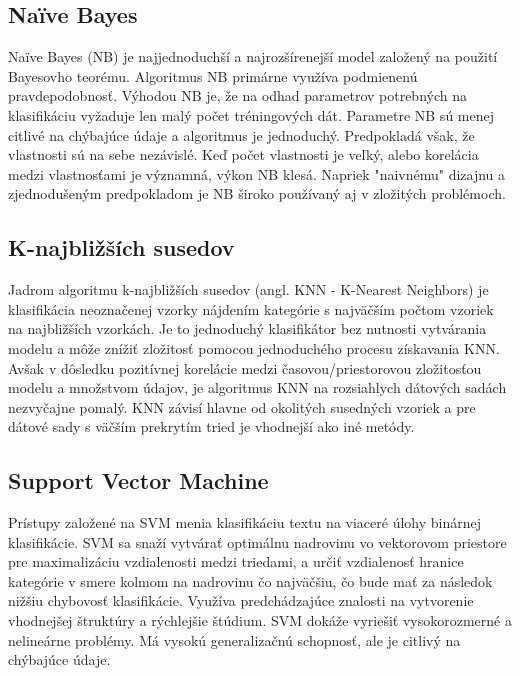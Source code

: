 \subsection*{Naïve Bayes}
Naïve Bayes (NB) je najjednoduchší a najrozšírenejší model založený na použití Bayesovho teorému. Algoritmus NB primárne využíva podmienenú pravdepodobnosť. Výhodou NB je, že na odhad parametrov potrebných na klasifikáciu vyžaduje len malý počet tréningových dát. Parametre NB sú menej citlivé na chýbajúce údaje a algoritmus je jednoduchý. Predpokladá však, že vlastnosti sú na sebe nezávislé. Keď počet vlastnosti je veľký, alebo korelácia medzi vlastnosťami je významná, výkon NB klesá. Napriek "naivnému" dizajnu a zjednodušeným predpokladom je NB široko používaný aj v zložitých problémoch.

\subsection*{K-najbližších susedov}
Jadrom algoritmu k-najbližších susedov (angl. KNN - K-Nearest Neighbors) je klasifikácia neoznačenej vzorky nájdením kategórie s najväčším počtom vzoriek na  najbližších vzorkách. Je to jednoduchý klasifikátor bez nutnosti vytvárania modelu a môže znížiť zložitosť pomocou jednoduchého procesu získavania KNN. Avšak v dôsledku pozitívnej korelácie medzi časovou/priestorovou zložitosťou modelu a množstvom údajov, je algoritmus KNN na rozsiahlych dátových sadách nezvyčajne pomalý. KNN závisí hlavne od okolitých susedných vzoriek a pre dátové sady s väčším prekrytím tried  je vhodnejší ako iné metódy.

\subsection*{Support Vector Machine}
Prístupy založené na SVM menia klasifikáciu textu na viaceré úlohy binárnej klasifikácie. SVM sa snaží vytvárať optimálnu nadrovinu vo vektorovom priestore pre maximalizáciu vzdialenosti medzi triedami, a určiť vzdialenosť hranice kategórie v smere kolmom na nadrovinu čo najväčšiu, čo bude mať za následok nižšiu chybovosť klasifikácie. Využíva predchádzajúce znalosti na vytvorenie vhodnejšej štruktúry a rýchlejšie štúdium. SVM dokáže vyriešiť vysokorozmerné a nelineárne problémy. Má vysokú generalizačnú schopnosť, ale je citlivý na chýbajúce údaje.

